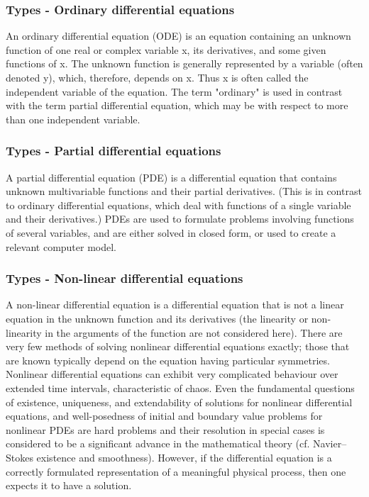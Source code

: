 \documentclass{beamer}
\begin{document}
\begin{frame}
  \frametitle {Types - Ordinary differential equations}
  An ordinary differential equation (ODE) is an equation containing an unknown function of one real or complex variable x, its derivatives, and some given functions of x. 
  The unknown function is generally represented by a variable (often denoted y), which, therefore, depends on x. Thus x is often called the independent variable of the equation. 
  The term "ordinary" is used in contrast with the term partial differential equation, which may be with respect to more than one independent variable.
  \end{frame}

  \begin{frame}
  \frametitle {Types - Partial differential equations}
  A partial differential equation (PDE) is a differential equation that contains unknown multivariable functions and their partial derivatives. 
  (This is in contrast to ordinary differential equations, which deal with functions of a single variable and their derivatives.) 
  PDEs are used to formulate problems involving functions of several variables, and are either solved in closed form, or used to create a relevant computer model.
  \end{frame}

  \begin{frame}
  \frametitle {Types - Non-linear differential equations}
  A non-linear differential equation is a differential equation that is not a linear equation in the unknown function and its derivatives 
  (the linearity or non-linearity in the arguments of the function are not considered here). There are very few methods of solving nonlinear differential equations exactly; 
  those that are known typically depend on the equation having particular symmetries. Nonlinear differential equations can exhibit very complicated behaviour over extended time intervals, characteristic of chaos. 
  Even the fundamental questions of existence, uniqueness, and extendability of solutions for nonlinear differential equations, and well-posedness of initial and boundary value problems for nonlinear 
  PDEs are hard problems and their resolution in special cases is considered to be a significant advance in the mathematical theory (cf. Navier–Stokes existence and smoothness). 
  However, if the differential equation is a correctly formulated representation of a meaningful physical process, then one expects it to have a solution.
  \end{frame}
\end{document}
